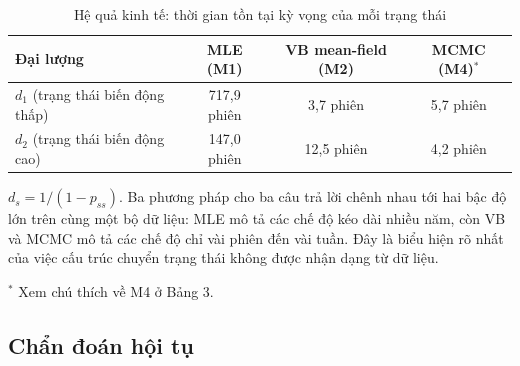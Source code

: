 \documentclass[11pt,a4paper]{article}
\begin{document}
\begin{table}[H]\centering
\caption{Hệ quả kinh tế: thời gian tồn tại kỳ vọng của mỗi trạng thái}
\begin{threeparttable}
\begin{tabularx}{\textwidth}{l C C C}
\toprule
\textbf{Đại lượng} & \textbf{MLE (M1)} & \textbf{VB mean-field (M2)} & \textbf{MCMC (M4)$^{*}$} \\
\midrule
$d_1$ (trạng thái biến động thấp) & 717{,}9 phiên & 3{,}7 phiên & 5{,}7 phiên \\
$d_2$ (trạng thái biến động cao) & 147{,}0 phiên & 12{,}5 phiên & 4{,}2 phiên \\
\bottomrule
\end{tabularx}
\begin{tablenotes}\small
\item $d_s = 1/(1-p_{ss})$. Ba phương pháp cho ba câu trả lời chênh nhau tới hai bậc độ lớn trên cùng một bộ dữ liệu: MLE mô tả các chế độ kéo dài nhiều năm, còn VB và MCMC mô tả các chế độ chỉ vài phiên đến vài tuần. Đây là biểu hiện rõ nhất của việc cấu trúc chuyển trạng thái không được nhận dạng từ dữ liệu.
\item[$^{*}$] Xem chú thích về M4 ở Bảng 3.
\end{tablenotes}
\end{threeparttable}
\end{table}


\subsection{Chẩn đoán hội tụ}
\end{document}
